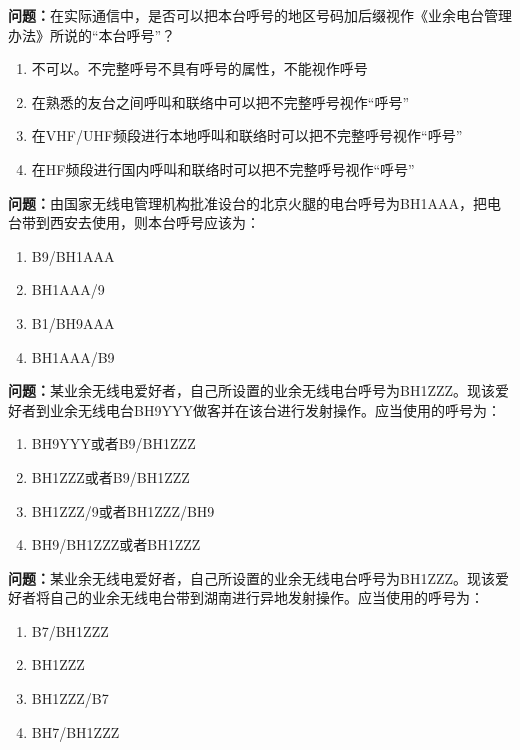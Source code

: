 \bigskip


\noindent\textbf{问题：}在实际通信中，是否可以把本台呼号的地区号码加后缀视作《业余电台管理办法》所说的“本台呼号”？
\begin{enumerate}[label=\Alph*), leftmargin=3em]
\item 不可以。不完整呼号不具有呼号的属性，不能视作呼号
\item 在熟悉的友台之间呼叫和联络中可以把不完整呼号视作“呼号”
\item 在VHF/UHF频段进行本地呼叫和联络时可以把不完整呼号视作“呼号”
\item 在HF频段进行国内呼叫和联络时可以把不完整呼号视作“呼号”
\end{enumerate}

\bigskip


\noindent\textbf{问题：}由国家无线电管理机构批准设台的北京火腿的电台呼号为BH1AAA，把电台带到西安去使用，则本台呼号应该为：
\begin{enumerate}[label=\Alph*), leftmargin=3em]
\item B9/BH1AAA
\item BH1AAA/9
\item B1/BH9AAA
\item BH1AAA/B9
\end{enumerate}

\bigskip


\noindent\textbf{问题：}某业余无线电爱好者，自己所设置的业余无线电台呼号为BH1ZZZ。现该爱好者到业余无线电台BH9YYY做客并在该台进行发射操作。应当使用的呼号为：
\begin{enumerate}[label=\Alph*), leftmargin=3em]
\item BH9YYY或者B9/BH1ZZZ
\item BH1ZZZ或者B9/BH1ZZZ
\item BH1ZZZ/9或者BH1ZZZ/BH9
\item BH9/BH1ZZZ或者BH1ZZZ
\end{enumerate}

\bigskip


\noindent\textbf{问题：}某业余无线电爱好者，自己所设置的业余无线电台呼号为BH1ZZZ。现该爱好者将自己的业余无线电台带到湖南进行异地发射操作。应当使用的呼号为：
\begin{enumerate}[label=\Alph*), leftmargin=3em]
\item B7/BH1ZZZ
\item BH1ZZZ
\item BH1ZZZ/B7
\item BH7/BH1ZZZ
\end{enumerate}

